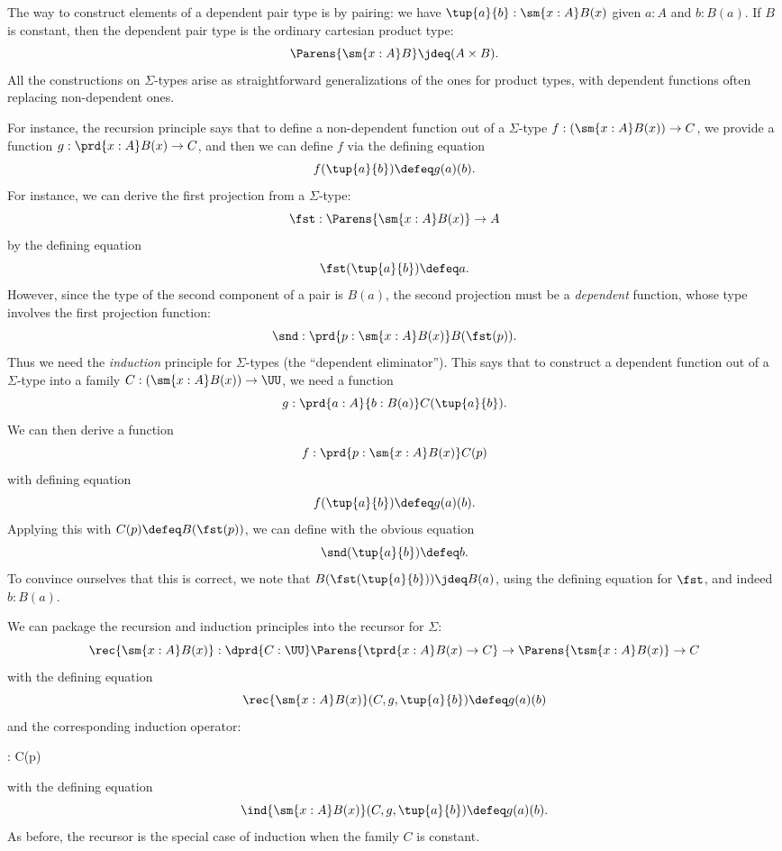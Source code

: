 %
%
The way to construct elements of a dependent pair type is by pairing: we have
$\tup{a}{b} : \sm{x:A} B(x)$ given $a:A$ and $b:B(a)$.
If $B$ is constant, then the dependent pair type is the
ordinary cartesian product type:
\[ \Parens{\sm{x:A} B} \jdeq (A \times B).\]
All the constructions on $\Sigma$-types arise as straightforward generalizations of the ones for product types, with dependent functions often replacing non-dependent ones.

For instance, the recursion principle%
says that to define a non-dependent function out of a $\Sigma$-type
$f : (\sm{x:A} B(x)) \to C$, we provide a function 
$g : \prd{x:A} B(x) \to C$, and then we can define $f$ via the defining
equation
\[ f(\tup{a}{b}) \defeq g(a)(b). \]
%
For instance, we can derive the first projection from a $\Sigma$-type:
%
\begin{equation*}
  \fst : \Parens{\sm{x : A}B(x)} \to A
\end{equation*}
by the defining equation
\begin{equation*}
  \fst(\tup{a}{b}) \defeq a.
\end{equation*}
However, since the type of the second component of a pair
is $B(a)$, the second projection must be a \emph{dependent} function, whose type involves the first projection function:
%
\[ \snd : \prd{p:\sm{x : A}B(x)}B(\fst(p)). \]
Thus we need the \emph{induction} principle%
for $\Sigma$-types (the ``dependent eliminator'').
This says that to construct a dependent function out of a $\Sigma$-type into a family $C : (\sm{x:A} B(x)) \to \UU$, we need a function
\[ g : \prd{a:A}{b:B(a)} C(\tup{a}{b}). \]
We can then derive a function 
\[ f : \prd{p : \sm{x:A}B(x)} C(p) \]
with  defining equation
\[ f(\tup{a}{b}) \defeq g(a)(b).\]
Applying this with $C(p)\defeq B(\fst(p))$, we can define
with the obvious equation
\[ \snd(\tup{a}{b})  \defeq  b. \]
To convince ourselves that this is correct, we note that $B (\fst(\tup{a}{b})) \jdeq B(a)$, using the defining equation for $\fst$, and
indeed $b : B(a)$.

We can package the recursion and induction principles into the recursor for $\Sigma$:
%
\[ \rec{\sm{x:A}B(x)} : \dprd{C:\UU}\Parens{\tprd{x:A} B(x) \to C} \to
\Parens{\tsm{x:A}B(x)} \to C \]
with the defining equation
\[ \rec{\sm{x:A}B(x)}(C,g,\tup{a}{b}) \defeq g(a)(b) \]
and the corresponding induction operator:
%
\begin{narrowmultline*}
   : \narrowbreak
    \to {} C(p)
\end{narrowmultline*}
with the defining equation 
\[ \ind{\sm{x:A}B(x)}(C,g,\tup{a}{b}) \defeq g(a)(b). \]
As before, the recursor is the special case of induction
when the family $C$ is constant.

